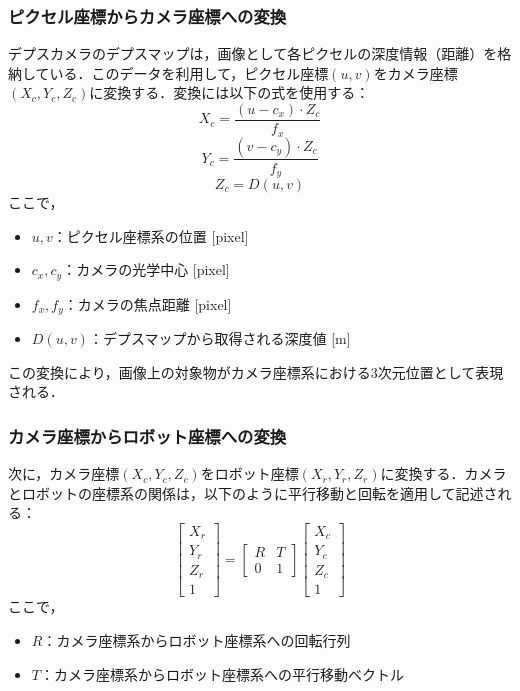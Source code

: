 \subsubsection{ピクセル座標からカメラ座標への変換}
デプスカメラのデプスマップは，画像として各ピクセルの深度情報（距離）を格納している．このデータを利用して，ピクセル座標$(u, v)$をカメラ座標$(X_c, Y_c, Z_c)$に変換する．変換には以下の式を使用する：
\begin{equation}
    X_c = \frac{(u - c_x) \cdot Z_c}{f_x}
    \label{eq:xc}
\end{equation}
\begin{equation}
    Y_c = \frac{(v - c_y) \cdot Z_c}{f_y}
    \label{eq:yc}
\end{equation}
\begin{equation}
    Z_c = D(u, v)
    \label{eq:zc}
\end{equation}
ここで，
\begin{itemize}
    \item $u, v$：ピクセル座標系の位置 [pixel]
    \item $c_x, c_y$：カメラの光学中心 [pixel]
    \item $f_x, f_y$：カメラの焦点距離 [pixel]
    \item $D(u, v)$：デプスマップから取得される深度値 [m]
\end{itemize}

この変換により，画像上の対象物がカメラ座標系における3次元位置として表現される．

\subsubsection{カメラ座標からロボット座標への変換}
次に，カメラ座標$(X_c, Y_c, Z_c)$をロボット座標$(X_r, Y_r, Z_r)$に変換する．カメラとロボットの座標系の関係は，以下のように平行移動と回転を適用して記述される：
\begin{equation}
    \begin{bmatrix}
        X_r \\ Y_r \\ Z_r \\ 1
    \end{bmatrix}
    =
    \begin{bmatrix}
        R & T \\
        0 & 1
    \end{bmatrix}
    \begin{bmatrix}
        X_c \\ Y_c \\ Z_c \\ 1
    \end{bmatrix}
\end{equation}
ここで，
\begin{itemize}
    \item $R$：カメラ座標系からロボット座標系への回転行列
    \item $T$：カメラ座標系からロボット座標系への平行移動ベクトル
\end{itemize}

